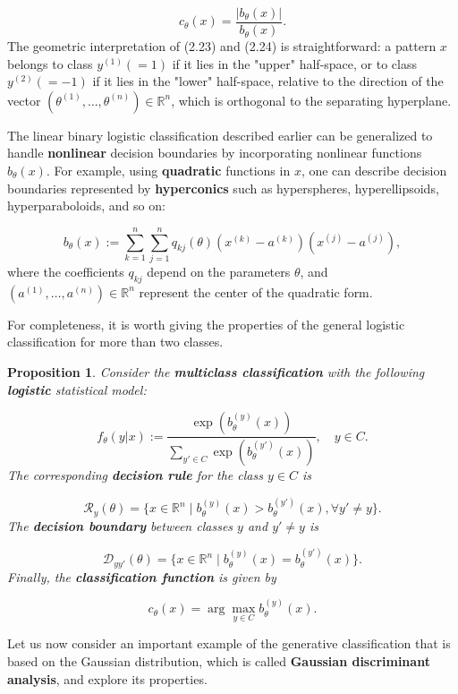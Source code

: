 \documentclass{report}
\newtheorem{proposition}{Proposition}[chapter]
\begin{document}
\begin{equation}
c_\theta(x) = \frac{|b_\theta(x)|}{b_\theta(x)}.
\end{equation}
The geometric interpretation of (2.23) and (2.24) is straightforward: a pattern $x$ belongs to class $y^{(1)} (=1)$ if it lies in the "upper" half-space, or to class $y^{(2)}(=-1)$ if it lies in the "lower" half-space, relative to the direction of the vector $(\theta^{(1)},\dots,\theta^{(n)}) \in \mathbb{R}^n$, which is orthogonal to the separating hyperplane.

The linear binary logistic classification described earlier can be generalized to handle \textbf{nonlinear} decision boundaries by incorporating nonlinear functions $b_\theta(x)$. For example, using \textbf{quadratic} functions in $x$, one can describe decision boundaries represented by \textbf{hyperconics} such as hyperspheres, hyperellipsoids, hyperparaboloids, and so on:

\begin{equation}
b_\theta(x) := \sum_{k=1}^{n}\sum_{j=1}^{n}q_{kj}(\theta)(x^{(k)}-a^{(k)})(x^{(j)} - a^{(j)}),
\end{equation}
where the coefficients $q_{kj}$ depend on the parameters $\theta$, and $(a^{(1)},\dots,a^{(n)}) \in \mathbb{R}^n$ represent the center of the quadratic form.

For completeness, it is worth giving the properties of the general logistic classification for more than two classes.

\begin{proposition}
Consider the \textbf{multiclass classification} with the following \textbf{logistic} statistical model:

\begin{equation}
f_\theta(y|x) := \frac{\exp(b_\theta^{(y)}(x))}{\sum_{y' \in C}\exp(b_\theta^{(y')}(x))}, \quad y \in C.
\end{equation}
The corresponding \textbf{decision rule} for the class $y \in C$ is

\begin{equation}
\mathcal{R}_y(\theta) = \{x \in \mathbb{R}^n \mid b_\theta^{(y)}(x) > b_\theta^{(y')}(x), \forall y' \neq y\}.
\end{equation}
The \textbf{decision boundary} between classes $y$ and $y' \neq y$ is

\begin{equation}
\mathcal{D}_{yy'}(\theta) = \{x \in \mathbb{R}^n \mid b_\theta^{(y)}(x) = b_\theta^{(y')}(x)\}.
\end{equation}
Finally, the \textbf{classification function} is given by

\begin{equation}
c_\theta(x) = \arg \max_{y \in C} b_\theta^{(y)}(x).
\end{equation}
\end{proposition}
Let us now consider an important example of the generative classification that is based on the Gaussian distribution, which is called \textbf{Gaussian discriminant analysis}, and explore its properties.
\end{document}
